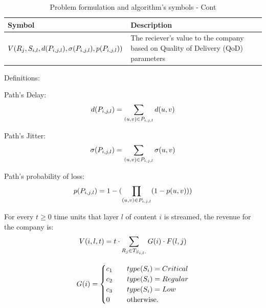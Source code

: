 \documentclass[a4paper, 10pt, conference]{ieeeconf}
\begin{document}
\begin{table}[ht]
\caption{Problem formulation and algorithm's symbols - Cont} 
\begin{center}
\label{tab:LISTOFABBREVIATIONS3}
\begin{tabular}{|p{5cm}|p{2cm}|}
\hline
    \textbf{Symbol} & \textbf{Description} \\\hline
    $V(R_j, S_{i,l}, d(P_{i,j,l}), \sigma(P_{i,j,l}), p(P_{i,j,l}))$ & The reciever's value to the company based on Quality of Delivery (QoD) parameters
     \\\hline
\end{tabular}
\end{center}
\end{table}

Definitions:
\newline

Path's Delay:
\begin{equation}
d(P_{i,j,l})= \sum_{(u,v) \in P_{i,j,l} } d(u,v)
\end{equation}

Path's Jitter:
\begin{equation}
\sigma(P_{i,j,l}) = \sum_{ (u,v) \in P_{i,j,l} } \sigma(u,v)
\end{equation}

Path's probability of loss:
\begin{equation}
p(P_{i,j,l}) = 1 - (\prod_{(u,v) \in P_{i,j,l}}(1 - p(u,v)))
\end{equation}

For every $t \geq 0$ time units that layer $l$ of content $i$ is streamed, the revenue for the company is:
\begin{equation}
V(i, l, t) = t \cdot \sum_{R_j \in T_{S_{i,l},}} G(i) \cdot F(l, j)
\end{equation}

\begin{equation}
G(i) = \begin{cases}
c_{1} 	&\quad type(S_i) = Critical  	\\
c_{2} 	&\quad type(S_i) = Regular  		\\
c_{3} 	&\quad type(S_i) = Low   		\\
0 		&\quad\text{otherwise.} 			\\ 
\end{cases}
\end{equation}
\end{document}
